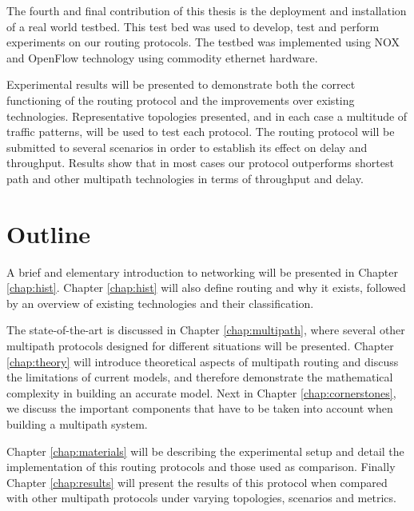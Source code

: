 The fourth and final contribution of this thesis is the deployment and installation of a real world testbed. This test bed was used to develop, test and perform experiments on our routing protocols. The testbed was implemented using NOX and OpenFlow technology using commodity ethernet hardware.

Experimental results will be presented to demonstrate both the correct
functioning of the routing protocol and the improvements over existing
technologies. Representative topologies presented, and in each case a
multitude of traffic patterns, will be used to test each protocol. The routing protocol will
be submitted to several scenarios in order to establish its effect on delay and
throughput. Results show that in most cases our protocol outperforms shortest
path and other multipath technologies in terms of throughput and delay.


\section{Outline}

A brief and elementary introduction to networking will be presented in Chapter
\ref{chap:hist}. Chapter \ref{chap:hist} will also define routing and why it
exists, followed by an overview of existing technologies and their
classification. 

The state-of-the-art is discussed in Chapter \ref{chap:multipath}, where several
other multipath protocols designed for different situations will be presented.
Chapter \ref{chap:theory} will introduce theoretical aspects of multipath
routing and discuss the limitations of current models, and therefore demonstrate the
mathematical complexity in building an accurate model. Next in Chapter
\ref{chap:cornerstones}, we discuss the important components that have to be
taken into account when building a multipath system.

Chapter \ref{chap:materials} will be describing the experimental setup and
detail the implementation of this routing protocols and those used as
comparison. Finally Chapter \ref{chap:results} will present the results of this
protocol when compared with other multipath protocols under varying topologies,
scenarios and metrics.





